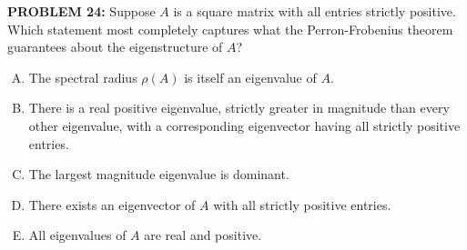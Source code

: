 \documentclass[12pt]{amsart}
\begin{document}
{\bf PROBLEM 24:}
Suppose $A$ is a square matrix with all entries strictly positive. Which statement most completely captures what the Perron-Frobenius theorem guarantees about the eigenstructure of $A$?

\begin{enumerate}[(A)]
\item The spectral radius $\rho(A)$ is itself an eigenvalue of $A$.
\item There is a real positive eigenvalue, strictly greater in magnitude than every other eigenvalue, with a corresponding eigenvector having all strictly positive entries.
\item The largest magnitude eigenvalue is dominant.
\item There exists an eigenvector of $A$ with all strictly positive entries.
\item All eigenvalues of $A$ are real and positive.
\end{enumerate}
\end{document}
